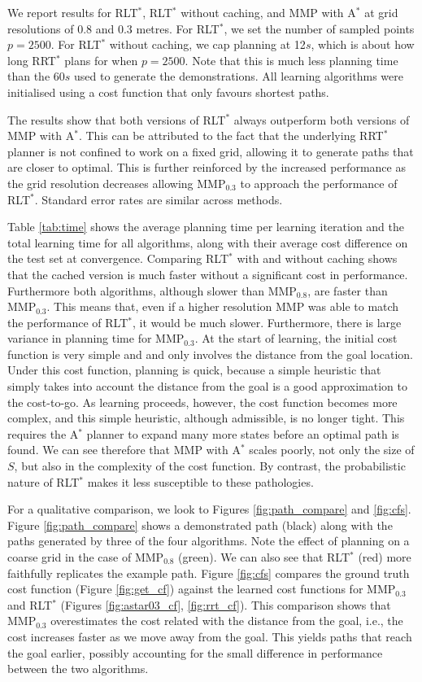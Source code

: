 \documentclass[a4paper,11pt]{report}
\begin{document}
We report results for RLT$^*$, RLT$^*$ without caching, and MMP with A$^*$ at grid resolutions of 0.8 and 0.3 metres.  For RLT$^*$, we set the number of sampled points $p=2500$. For RLT$^*$ without 
caching, we cap planning at 12$s$, which is about how long RRT$^*$ plans for when $p=2500$.  Note 
that this is much less planning time than the 60$s$ used to generate the demonstrations.
 All learning algorithms were initialised using a cost function that only favours shortest paths.

The results show that both versions of RLT$^*$ always outperform both versions of MMP with A$^*$. This can be attributed to the fact that the underlying RRT$^*$ planner is not confined to work on a fixed grid, allowing it to generate paths that are closer to optimal. This is further reinforced by the increased performance as the grid resolution decreases allowing MMP$_{0.3}$ to approach the performance of RLT$^*$. Standard error rates are similar across methods.

	Table \ref{tab:time} shows the average planning time per learning iteration and the total learning time for all algorithms, along with their average cost difference on the test set at convergence. Comparing RLT$^*$ with and without caching shows that the cached version is much faster without a significant cost in performance. Furthermore both algorithms, although slower than MMP$_{0.8}$, are faster than MMP$_{0.3}$. This means that, even if a higher resolution MMP  was able to match the performance of RLT$^*$, it would be much slower. Furthermore, there is large variance in planning time for MMP$_{0.3}$. At the start of learning, the initial cost function is very simple and and only involves the distance from the goal location. Under this cost function, planning is quick, because a simple heuristic that simply takes into account the distance from the goal is a  good approximation to the cost-to-go. As learning proceeds, however, the cost function becomes more complex, and this simple heuristic, although admissible, is no longer tight. This requires the A$^*$ planner to expand many more states before an optimal path is found. We can see therefore that MMP with A$^*$ scales poorly, not only the size of $S$, but also in the complexity of the cost function. By contrast, the probabilistic nature of RLT$^*$ makes it less susceptible to these pathologies.  

	For a qualitative comparison, we look to Figures \ref{fig:path_compare} and \ref{fig:cfs}. Figure \ref{fig:path_compare} shows a demonstrated path (black) along with the paths generated by three of the four algorithms. Note the effect of planning on a coarse grid in the case of MMP$_{0.8}$ (green). We can also see that RLT$^*$ (red) more faithfully replicates the example path. Figure \ref{fig:cfs} compares the ground truth cost function (Figure \ref{fig:get_cf}) against the learned cost functions for  MMP$_{0.3}$ and RLT$^*$ (Figures \ref{fig:astar03_cf}, \ref{fig:rrt_cf}). This comparison shows that  MMP$_{0.3}$ overestimates the cost related with the distance from the goal, i.e., the cost increases faster as we move away from the goal. This yields paths that reach the goal earlier, possibly accounting for the small difference in performance between the two algorithms. 
\end{document}
